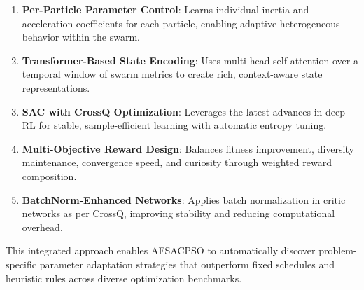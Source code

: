 \begin{enumerate}
\item \textbf{Per-Particle Parameter Control}: Learns individual inertia and acceleration coefficients for each particle, enabling adaptive heterogeneous behavior within the swarm.
\item \textbf{Transformer-Based State Encoding}: Uses multi-head self-attention over a temporal window of swarm metrics to create rich, context-aware state representations.
\item \textbf{SAC with CrossQ Optimization}: Leverages the latest advances in deep RL for stable, sample-efficient learning with automatic entropy tuning.
\item \textbf{Multi-Objective Reward Design}: Balances fitness improvement, diversity maintenance, convergence speed, and curiosity through weighted reward composition.
\item \textbf{BatchNorm-Enhanced Networks}: Applies batch normalization in critic networks as per CrossQ, improving stability and reducing computational overhead.
\end{enumerate}

This integrated approach enables AFSACPSO to automatically discover problem-specific parameter adaptation strategies that outperform fixed schedules and heuristic rules across diverse optimization benchmarks.

